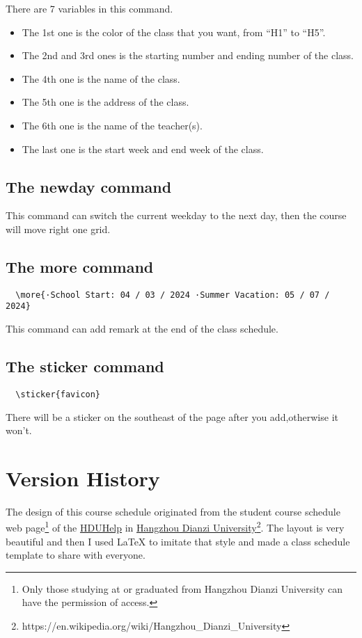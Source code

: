 \documentclass[11pt]{article}
\def\cmd#1{\texorpdfstring{\textcolor{cmdcolor}{\textsf{#1}}}{“#1”}}
\begin{document}
There are 7 variables in this command.
\begin{itemize}
  \item The 1st one is the color of the class that you want, from ``H1'' to ``H5''.
  \item The 2nd and 3rd ones is the starting number and ending number of the class.
  \item The 4th one is the name of the class.
  \item The 5th one is the address of the class.
  \item The 6th one is the name of the teacher(s).
  \item The last one is the start week and end week of the class.
\end{itemize}

\subsection{The \cmd{newday} command}
This command can switch the current weekday to the next day, then the course will move right one grid.

\subsection{The \cmd{more} command}
\begin{verbatim}
  \more{·School Start: 04 / 03 / 2024 ·Summer Vacation: 05 / 07 / 2024}
\end{verbatim}
This command can add remark at the end of the class schedule.

\subsection{The \cmd{sticker} command}
\begin{verbatim}
  \sticker{favicon}
\end{verbatim}
There will be a sticker on the southeast of the page after you add,otherwise it won't.

\section{Version History}

The design of this course schedule originated from the student course schedule web page\footnote{Only those studying at or graduated from Hangzhou Dianzi University can have the permission of access.} of the \href{https://www.hduhelp.cn/}{HDUHelp} in \href{https://www.hdu.edu.cn}{Hangzhou Dianzi University}\footnote{https://en.wikipedia.org/wiki/Hangzhou\_Dianzi\_University}. The layout is very beautiful and then I used \LaTeX{} to imitate that style and made a class schedule template to share with everyone.
\end{document}
